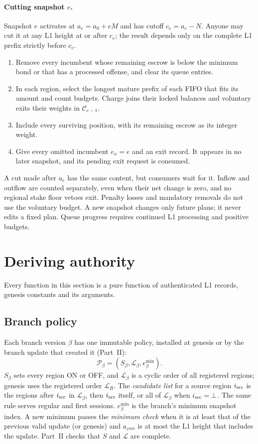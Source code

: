 \documentclass[11pt,a4paper]{article}
\newcommand{\cfg}{\mathcal C}
\newcommand{\emin}{e^{\min}}
\begin{document}
\paragraph{Cutting snapshot $e$.}
Snapshot $e$ activates at $a_e=a_0+eM$ and has cutoff $c_e=a_e-N$.
Anyone may cut it at any L1 height at or after $c_e$; the result depends
only on the complete L1 prefix strictly before $c_e$.
\begin{enumerate}[label=\textbf{\arabic*.},itemsep=2pt]
\item Remove every incumbent whose remaining escrow is below the minimum
bond or that has a processed offense, and clear its queue entries.
\item In each region, select the longest mature prefix of each FIFO that
fits its amount and count budgets. Charge joins their locked balances
and voluntary exits their weights in $\cfg_{e-1}$.
\item Include every surviving position, with its remaining escrow as its
integer weight.
\item Give every omitted incumbent $e_x=e$ and an exit record. It appears
in no later snapshot, and its pending exit request is consumed.
\end{enumerate}
A cut made after $a_e$ has the same content, but consumers wait for it.
Inflow and outflow are counted separately, even when their net change is
zero, and no regional stake floor vetoes exit. Penalty losses and
mandatory removals do not use the voluntary budget. A new snapshot
changes only future plans; it never edits a fixed plan. Queue progress
requires continued L1 processing and positive budgets.

\section{Deriving authority}
\label{sec:derive}
Every function in this section is a pure function of authenticated L1
records, genesis constants and its arguments.

\subsection{Branch policy}
\label{sec:policy}
Each branch version $\beta$ has one immutable policy, installed at
genesis or by the branch update that created it (Part~II):
\[
 \mathcal P_\beta=(S_\beta,\mathcal L_\beta,\emin_\beta).
\]
$S_\beta$ sets every region ON or OFF, and $\mathcal L_\beta$ is a cyclic
order of all registered regions; genesis uses the registered order
$\mathcal L_R$. The \emph{candidate list} for a source region
$i_{\rm src}$ is the regions after $i_{\rm src}$ in $\mathcal L_\beta$,
then $i_{\rm src}$ itself, or all of $\mathcal L_\beta$ when
$i_{\rm src}=\bot$. The same rule serves regular and first sessions.
$\emin_\beta$ is the branch's minimum snapshot index. A new minimum passes
the \emph{minimum check} when it is at least that of the previous valid
update (or genesis) and $a_{\emin}$ is at most the L1 height that
includes the update. Part~II checks that $S$ and $\mathcal L$ are
complete.
\end{document}

